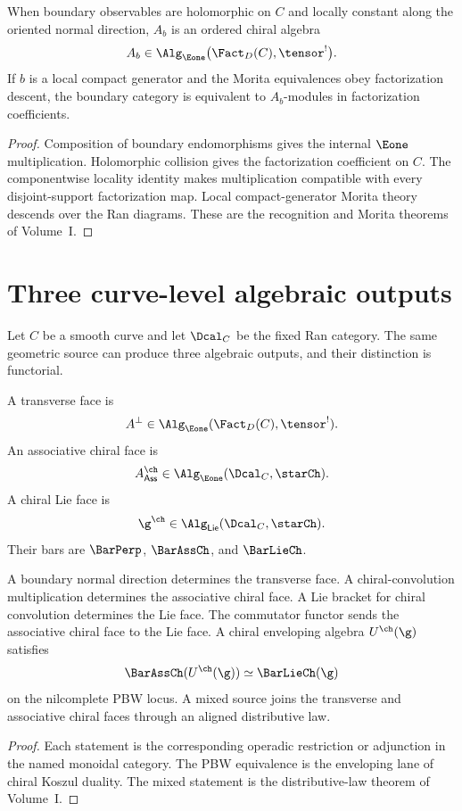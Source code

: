 \begin{theorem}
When boundary observables are holomorphic on $C$ and locally constant along the oriented normal direction, $A_b$ is an ordered chiral algebra
\[
 A_b\in\Alg_{\Eone}\bigl(\Fact_D(C),\tensor^!\bigr).
\]
If $b$ is a local compact generator and the Morita equivalences obey factorization descent, the boundary category is equivalent to $A_b$-modules in factorization coefficients.
\end{theorem}
\begin{proof}
Composition of boundary endomorphisms gives the internal $\Eone$ multiplication. Holomorphic collision gives the factorization coefficient on $C$. The componentwise locality identity makes multiplication compatible with every disjoint-support factorization map. Local compact-generator Morita theory descends over the Ran diagrams. These are the recognition and Morita theorems of Volume~I.
\end{proof}


\chapter{Three curve-level algebraic outputs}
Let $C$ be a smooth curve and let $\Dcal_C$ be the fixed Ran category.  The same geometric source can produce three algebraic outputs, and their distinction is functorial.

\begin{definition}
A transverse face is
\[
 A^\perp\in\Alg_{\Eone}(\Fact_D(C),\tensor^!).
\]
An associative chiral face is
\[
 A^{\ch}_{\mathsf{Ass}}\in\Alg_{\Eone}(\Dcal_C,\starCh).
\]
A chiral Lie face is
\[
 \g^{\ch}\in\Alg_{\mathsf{Lie}}(\Dcal_C,\starCh).
\]
Their bars are $\BarPerp$, $\BarAssCh$, and $\BarLieCh$.
\end{definition}

\begin{theorem}
A boundary normal direction determines the transverse face.  A chiral-convolution multiplication determines the associative chiral face.  A Lie bracket for chiral convolution determines the Lie face.  The commutator functor sends the associative chiral face to the Lie face.  A chiral enveloping algebra $U^{\ch}(\g)$ satisfies
\[
 \BarAssCh(U^{\ch}(\g))\simeq\BarLieCh(\g)
\]
on the nilcomplete PBW locus.  A mixed source joins the transverse and associative chiral faces through an aligned distributive law.
\end{theorem}
\begin{proof}
Each statement is the corresponding operadic restriction or adjunction in the named monoidal category.  The PBW equivalence is the enveloping lane of chiral Koszul duality.  The mixed statement is the distributive-law theorem of Volume~I.
\end{proof}

